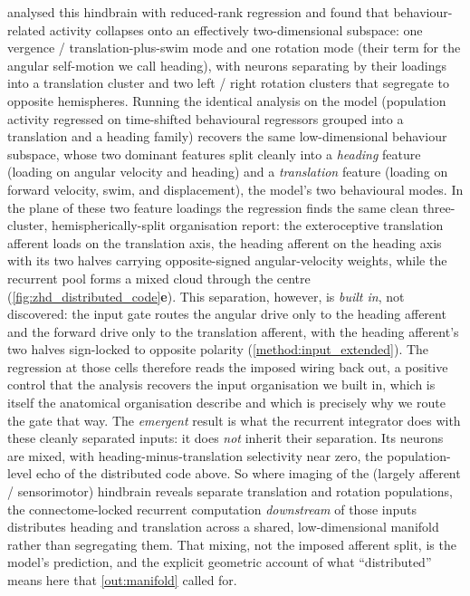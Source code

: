 \documentclass[11pt]{article}
\begin{document}
 analysed this hindbrain with reduced-rank regression
and found that behaviour-related activity collapses onto an effectively
two-dimensional subspace: one vergence / translation-plus-swim mode and one
rotation mode (their term for the angular self-motion we call heading), with
neurons separating by their loadings into a translation cluster and two
left / right rotation clusters that segregate to opposite hemispheres. Running
the identical analysis on the model (population activity regressed on
time-shifted behavioural regressors grouped into a translation and a heading
family) recovers the same low-dimensional behaviour subspace, whose two
dominant features split cleanly into a \emph{heading} feature (loading on
angular velocity and heading) and a \emph{translation} feature (loading on
forward velocity, swim, and displacement), the model's two behavioural modes.
In the plane of these two feature loadings the regression finds the same clean
three-cluster, hemispherically-split organisation \citet{feierstein2023}
report: the exteroceptive translation afferent loads on the translation axis,
the heading afferent on the heading axis with its two halves carrying
opposite-signed angular-velocity weights, while the recurrent pool forms a
mixed cloud through the centre (\cref{fig:zhd_distributed_code}\textbf{e}).
This separation, however, is
\emph{built in}, not discovered: the input gate routes the angular drive only
to the heading afferent and the forward drive only to the translation
afferent, with the heading afferent's two halves sign-locked to opposite
polarity (\cref{method:input_extended}). The regression at those cells
therefore reads the imposed wiring back out, a positive control that the
analysis recovers the input organisation we built in, which is itself the
anatomical organisation \citet{feierstein2023} describe and which is precisely
why we route the gate that way. The \emph{emergent} result is what the
recurrent integrator does with these cleanly separated inputs: it does
\emph{not} inherit their separation. Its neurons are mixed, with
heading-minus-translation selectivity near zero, the population-level echo
of the distributed code above. So where imaging of the (largely afferent /
sensorimotor) hindbrain reveals separate translation and rotation populations,
the connectome-locked recurrent computation \emph{downstream} of those inputs
distributes heading and translation across a shared, low-dimensional manifold
rather than segregating them. That mixing, not the imposed afferent split,
is the model's prediction, and the explicit geometric account of what
``distributed'' means here that \cref{out:manifold} called for.
\end{document}
